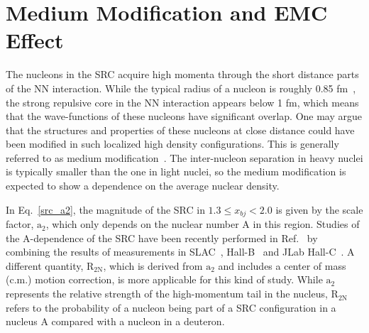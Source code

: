 \section{Medium Modification and EMC Effect}
  The nucleons in the SRC acquire high momenta through the short distance parts of the NN interaction. While the typical radius of a nucleon is roughly 0.85 fm~\cite{xiaohui}, the strong repulsive core in the NN interaction appears below 1 fm, which means that the wave-functions of these nucleons have significant overlap. One may argue that the structures and properties of these nucleons at close distance could have been modified in such localized high density configurations. This is generally referred to as medium modification~\cite{john_src_emc}. The inter-nucleon separation in heavy nuclei is typically smaller than the one in light nuclei, so the medium modification is expected to show a dependence on the average nuclear density.
  
 In Eq.~\eqref{src_a2}, the magnitude of the SRC in $1.3\leq x_{bj}<2.0$ is given by the scale factor, $\mathrm{a_{2}}$, which only depends on the nuclear number A in this region. Studies of the A-dependence of the SRC have been recently performed in Ref.~\cite{PhysRevLett.106.052301, john_src_emc} by combining the results of measurements in SLAC~\cite{SLAC_Measurement_PRC.48.2451}, Hall-B~\cite{PhysRevLett.96.082501} and JLab Hall-C~\cite{PhysRevLett.108.092502}. A different quantity, $\mathrm{R_{2N}}$, which is derived from $\mathrm{a_{2}}$ and includes a center of mass (c.m.) motion correction, is more applicable for this kind of study. While $\mathrm{a_{2}}$ represents the relative strength of the high-momentum tail in the nucleus, $\mathrm{R_{2N}}$ refers to the probability of a nucleon being part of a SRC configuration in a nucleus A compared with a nucleon in a deuteron.
 
